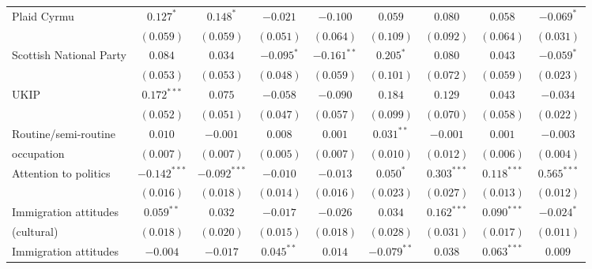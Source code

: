 \documentclass{article}
\begin{document}
\begin{table}
\begin{center}
{\begin{tabular}{l c c c c c c c c }
Plaid Cyrmu                      & $0.127^{*}$    & $0.148^{*}$    & $-0.021$       & $-0.100$       & $0.059$        & $0.080$        & $0.058$        & $-0.069^{*}$   \\
                                 & $(0.059)$      & $(0.059)$      & $(0.051)$      & $(0.064)$      & $(0.109)$      & $(0.092)$      & $(0.064)$      & $(0.031)$      \\
Scottish National Party          & $0.084$        & $0.034$        & $-0.095^{*}$   & $-0.161^{**}$  & $0.205^{*}$    & $0.080$        & $0.043$        & $-0.059^{*}$   \\
                                 & $(0.053)$      & $(0.053)$      & $(0.048)$      & $(0.059)$      & $(0.101)$      & $(0.072)$      & $(0.059)$      & $(0.023)$      \\
UKIP                             & $0.172^{***}$  & $0.075$        & $-0.058$       & $-0.090$       & $0.184$        & $0.129$        & $0.043$        & $-0.034$       \\
                                 & $(0.052)$      & $(0.051)$      & $(0.047)$      & $(0.057)$      & $(0.099)$      & $(0.070)$      & $(0.058)$      & $(0.022)$      \\
Routine/semi-routine   & $0.010$        & $-0.001$       & $0.008$        & $0.001$        & $0.031^{**}$   & $-0.001$       & $0.001$        & $-0.003$       \\
occupation                                 & $(0.007)$      & $(0.007)$      & $(0.005)$      & $(0.007)$      & $(0.010)$      & $(0.012)$      & $(0.006)$      & $(0.004)$      \\
Attention to politics            & $-0.142^{***}$ & $-0.092^{***}$ & $-0.010$       & $-0.013$       & $0.050^{*}$    & $0.303^{***}$  & $0.118^{***}$  & $0.565^{***}$  \\
                                 & $(0.016)$      & $(0.018)$      & $(0.014)$      & $(0.016)$      & $(0.023)$      & $(0.027)$      & $(0.013)$      & $(0.012)$      \\
Immigration attitudes  & $0.059^{**}$   & $0.032$        & $-0.017$       & $-0.026$       & $0.034$        & $0.162^{***}$  & $0.090^{***}$  & $-0.024^{*}$   \\
(cultural)                                 & $(0.018)$      & $(0.020)$      & $(0.015)$      & $(0.018)$      & $(0.028)$      & $(0.031)$      & $(0.017)$      & $(0.011)$      \\
Immigration attitudes  & $-0.004$       & $-0.017$       & $0.045^{**}$   & $0.014$        & $-0.079^{**}$  & $0.038$        & $0.063^{***}$  & $0.009$        \\

\end{tabular}}
\end{center}
\end{table}
\end{document}
